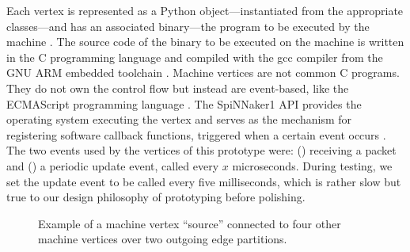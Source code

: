 \documentclass[]{article}
\begin{document}
Each vertex is represented as a Python object---instantiated from the
appropriate classes---and has an associated binary---the program to
be executed by the machine \citep{furber_et_al_2020}.
The source code of the binary to be executed on the machine is written
in the C programming language and compiled with the gcc compiler from
the GNU ARM embedded toolchain \citep{arm_2020, rowley_et_al_2019}.
Machine vertices are not common C programs.
They do not own the control flow but instead are event-based, like
the ECMAScript programming language \citep{ecma_2020}.
The SpiNNaker1 API provides the operating system executing the vertex
and serves as the mechanism for registering software callback
functions, triggered when a certain event occurs
\citep{furber_et_al_2020}.
The two events used by the vertices of this prototype were:
() receiving a packet and () a
periodic update event, called every $x$ microseconds.
During testing, we set the update event to be called every five
milliseconds, which is rather slow but true to our design philosophy
of prototyping before polishing.

\begin{figure} %
\begin{center}
\end{center}
\caption{Example of a machine vertex ``source'' connected to four
  other machine vertices over two outgoing edge partitions.}
\label{fig:partitions}
\end{figure} %
\end{document}
